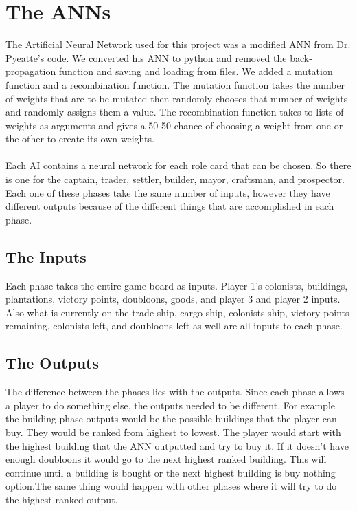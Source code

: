 \section{The ANNs }
The Artificial Neural Network used for this project was a modified ANN from Dr. Pyeatte's code. We converted his ANN to python and removed the back-propagation function and saving and loading from files. We added a mutation function and a recombination function. The mutation function takes the number of weights that are to be mutated then randomly chooses that number of weights and randomly assigns them a value. The recombination function takes to lists of weights as arguments and gives a 50-50 chance of choosing a weight from one or the other to create its own weights.
\\
\\
Each AI contains a neural network for each role card that can be chosen. So there is one for the captain, trader, settler, builder, mayor, craftsman, and prospector. Each one of these phases take the same number of inputs, however they have different outputs because of the different things that are accomplished in each phase.
\subsection{The Inputs}
Each phase takes the entire game board as inputs. Player 1's colonists, buildings, plantations, victory points, doubloons, goods, and player 3 and player 2 inputs. Also what is currently on the trade ship, cargo ship, colonists ship, victory points remaining, colonists left, and doubloons left as well are all inputs to each phase.
\subsection{The Outputs}
The difference between the phases lies with the outputs. Since each phase allows a player to do something else, the outputs needed to be different. For example the building phase outputs would be the possible buildings that the player can buy. They would be ranked from highest to lowest. The player would start with the highest building that the ANN outputted and try to buy it. If it doesn't have enough doubloons it would go to the next highest ranked building. This will continue until a building is bought or the next highest building is buy nothing option.The same thing would happen with other phases where it will try to do the highest ranked output.
